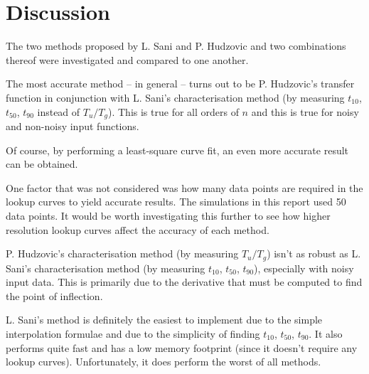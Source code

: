 \section{Discussion}

The two methods proposed by L. Sani and P. Hudzovic and two combinations thereof
were investigated and compared to one another.

The most accurate method -- in general -- turns out to be P. Hudzovic's transfer
function in conjunction with L. Sani's  characterisation  method  (by  measuring
$t_{10}$, $t_{50}$, $t_{90}$ instead of $T_u/T_g$). This  is true for all orders
of  $n$  and  this  is  true  for   noisy   and   non-noisy   input   functions.

Of course,  by performing a least-square curve fit, an even more accurate result
can be obtained.

One factor  that was not considered was how many data points are required in the
lookup curves to yield accurate results. The simulations in this  report used 50
data  points.  It  would  be  worth investigating this further to see how higher
resolution lookup curves affect the accuracy of each method.

P.  Hudzovic's  characterisation method (by measuring $T_u/T_g$) isn't as robust
as  L.  Sani's   characterisation   method  (by  measuring  $t_{10}$,  $t_{50}$,
$t_{90}$),  especially  with  noisy  input data. This is primarily  due  to  the
derivative  that  must  be  computed  to   find   the   point   of   inflection.

L. Sani's method is definitely  the  easiest  to  implement  due  to  the simple
interpolation formulae and due to  the simplicity of finding $t_{10}$, $t_{50}$,
$t_{90}$. It also performs quite  fast  and has a low memory footprint (since it
doesn't require any lookup curves).  Unfortunately, it does perform the worst of
all methods.

